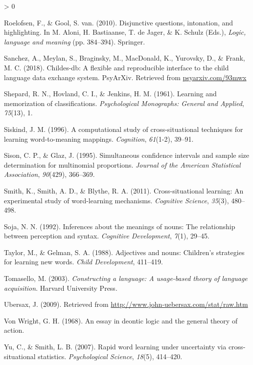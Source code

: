 \documentclass[
  english,
  ,man,floatsintext]{apa6}
\newlength{\cslhangindent}
\newenvironment{CSLReferences}[2] %
 {%
  \setlength{\parindent}{0pt}
  \ifodd #1 \everypar{\setlength{\hangindent}{\cslhangindent}}\ignorespaces\fi
  \ifnum #2 > 0
  \setlength{\parskip}{#2\baselineskip}
  \fi
 }%
 {}
\begin{document}
\begin{CSLReferences}{1}{0}
\leavevmode\hypertarget{ref-roelofsen2010disjunctive}{}%
Roelofsen, F., \& Gool, S. van. (2010). Disjunctive questions, intonation, and highlighting. In M. Aloni, H. Bastiaanse, T. de Jager, \& K. Schulz (Eds.), \emph{Logic, language and meaning} (pp. 384--394). Springer.

\leavevmode\hypertarget{ref-sanchez2018childes}{}%
Sanchez, A., Meylan, S., Braginsky, M., MacDonald, K., Yurovsky, D., \& Frank, M. C. (2018). Childes-db: A flexible and reproducible interface to the child language data exchange system. PsyArXiv. Retrieved from \href{https://psyarxiv.com/93mwx}{psyarxiv.com/93mwx}

\leavevmode\hypertarget{ref-shepard1961learning}{}%
Shepard, R. N., Hovland, C. I., \& Jenkins, H. M. (1961). Learning and memorization of classifications. \emph{Psychological Monographs: General and Applied}, \emph{75}(13), 1.

\leavevmode\hypertarget{ref-siskind1996computational}{}%
Siskind, J. M. (1996). A computational study of cross-situational techniques for learning word-to-meaning mappings. \emph{Cognition}, \emph{61}(1-2), 39--91.

\leavevmode\hypertarget{ref-sison1995simultaneous}{}%
Sison, C. P., \& Glaz, J. (1995). Simultaneous confidence intervals and sample size determination for multinomial proportions. \emph{Journal of the American Statistical Association}, \emph{90}(429), 366--369.

\leavevmode\hypertarget{ref-smith2011cross}{}%
Smith, K., Smith, A. D., \& Blythe, R. A. (2011). Cross-situational learning: An experimental study of word-learning mechanisms. \emph{Cognitive Science}, \emph{35}(3), 480--498.

\leavevmode\hypertarget{ref-soja1992inferences}{}%
Soja, N. N. (1992). Inferences about the meanings of nouns: The relationship between perception and syntax. \emph{Cognitive Development}, \emph{7}(1), 29--45.

\leavevmode\hypertarget{ref-taylor1988adjectives}{}%
Taylor, M., \& Gelman, S. A. (1988). Adjectives and nouns: Children's strategies for learning new words. \emph{Child Development}, 411--419.

\leavevmode\hypertarget{ref-tomasello2003constructing}{}%
Tomasello, M. (2003). \emph{Constructing a language: A usage-based theory of language acquisition}. Harvard University Press.

\leavevmode\hypertarget{ref-ubersax2009}{}%
Ubersax, J. (2009). Retrieved from \url{http://www.john-uebersax.com/stat/raw.htm}

\leavevmode\hypertarget{ref-von1968essay}{}%
Von Wright, G. H. (1968). An essay in deontic logic and the general theory of action.

\leavevmode\hypertarget{ref-yu2007rapid}{}%
Yu, C., \& Smith, L. B. (2007). Rapid word learning under uncertainty via cross-situational statistics. \emph{Psychological Science}, \emph{18}(5), 414--420.

\end{CSLReferences}
\end{document}
